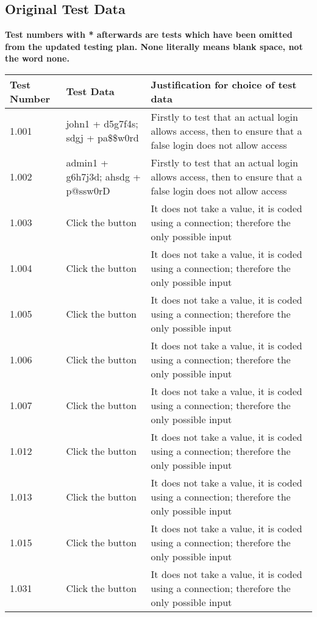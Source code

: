 \begin{landscape}
\subsection{Original Test Data}

\textbf{Test numbers with * afterwards are tests which have been omitted from the updated testing plan. None literally means blank space, not the word none.}

\begin{center}
\begin{longtable}{|p{4cm}|p{4cm}|p{5cm}|}
\textbf{Test Number} & \textbf{Test Data} & \textbf{Justification for choice of test data} \\ \hline
1.001 & john1 + d5g7f4s; sdgj + pa\$\$w0rd & Firstly to test that an actual login allows access, then to ensure that a false login does not allow access \\ \hline
1.002 & admin1 + g6h7j3d; ahsdg + p@ssw0rD & Firstly to test that an actual login allows access, then to ensure that a false login does not allow access \\ \hline
1.003 & Click the button & It does not take a value, it is coded using a connection; therefore the only possible input \\ \hline
1.004 & Click the button & It does not take a value, it is coded using a connection; therefore the only possible input \\ \hline
1.005 & Click the button & It does not take a value, it is coded using a connection; therefore the only possible input \\ \hline
1.006 & Click the button & It does not take a value, it is coded using a connection; therefore the only possible input \\ \hline
1.007 & Click the button & It does not take a value, it is coded using a connection; therefore the only possible input \\ \hline
1.012 & Click the button & It does not take a value, it is coded using a connection; therefore the only possible input \\ \hline
1.013 & Click the button & It does not take a value, it is coded using a connection; therefore the only possible input \\ \hline
1.015 & Click the button & It does not take a value, it is coded using a connection; therefore the only possible input \\ \hline
1.031 & Click the button & It does not take a value, it is coded using a connection; therefore the only possible input \\ \hline

\end{longtable}
\end{center}
\end{landscape}
